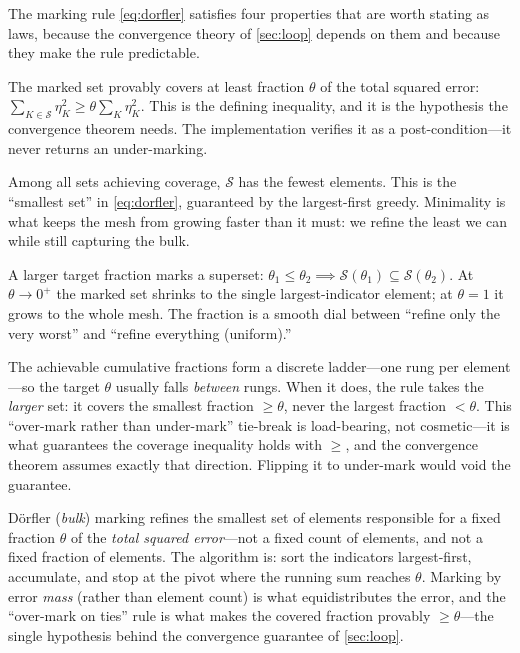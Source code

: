 The marking rule \cref{eq:dorfler} satisfies four properties that are worth stating
as laws, because the convergence theory of \cref{sec:loop} depends on them and because
they make the rule predictable.

\begin{description}[style=nextline, leftmargin=0pt, font=\normalfont\itshape]
\item[Coverage.] The marked set provably covers at least fraction $\theta$ of the
total squared error: $\sum_{K \in \mathcal S}\eta_K^2 \ge \theta\sum_K \eta_K^2$.
This is the defining inequality, and it is the hypothesis the convergence theorem
needs. The implementation verifies it as a post-condition---it never returns an
under-marking.
\item[Minimality.] Among all sets achieving coverage, $\mathcal S$ has the fewest
elements. This is the ``smallest set'' in \cref{eq:dorfler}, guaranteed by the
largest-first greedy. Minimality is what keeps the mesh from growing faster than it
must: we refine the least we can while still capturing the bulk.
\item[Monotonicity in $\theta$.] A larger target fraction marks a superset:
$\theta_1 \le \theta_2 \implies \mathcal S(\theta_1) \subseteq \mathcal S(\theta_2)$.
At $\theta \to 0^+$ the marked set shrinks to the single largest-indicator element;
at $\theta = 1$ it grows to the whole mesh. The fraction is a smooth dial between
``refine only the very worst'' and ``refine everything (uniform).''
\item[The over-mark tie-break.] The achievable cumulative fractions form a discrete
ladder---one rung per element---so the target $\theta$ usually falls \emph{between}
rungs. When it does, the rule takes the \emph{larger} set: it covers the smallest
fraction $\ge \theta$, never the largest fraction $< \theta$. This ``over-mark rather
than under-mark'' tie-break is load-bearing, not cosmetic---it is what guarantees the
coverage inequality holds with $\ge$, and the convergence theorem assumes exactly
that direction. Flipping it to under-mark would void the guarantee.
\end{description}

\begin{keyidea}
D\"orfler (\emph{bulk}) marking refines the smallest set of elements responsible for
a fixed fraction $\theta$ of the \emph{total squared error}---not a fixed count of
elements, and not a fixed fraction of elements. The algorithm is: sort the indicators
largest-first, accumulate, and stop at the pivot where the running sum reaches
$\theta$. Marking by error \emph{mass} (rather than element count) is what
equidistributes the error, and the ``over-mark on ties'' rule is what makes the
covered fraction provably $\ge \theta$---the single hypothesis behind the convergence
guarantee of \cref{sec:loop}.
\end{keyidea}

